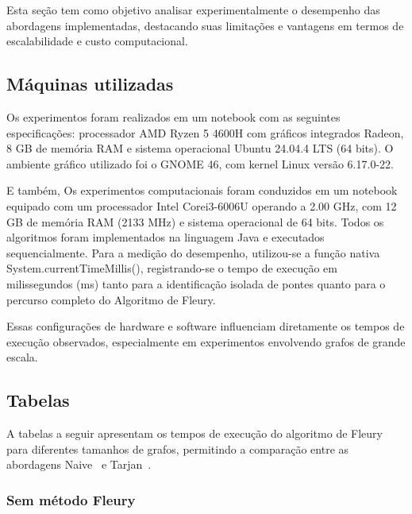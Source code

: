 \documentclass{sbc2023}%
\begin{document}
Esta seção tem como objetivo analisar experimentalmente o desempenho das abordagens implementadas, destacando suas limitações e vantagens em termos de escalabilidade e custo computacional.

\subsection{Máquinas utilizadas}
Os experimentos foram realizados em um notebook com as seguintes especificações: processador AMD Ryzen 5 4600H com gráficos integrados Radeon, 8 GB de memória RAM e sistema operacional Ubuntu 24.04.4 LTS (64 bits). O ambiente gráfico utilizado foi o GNOME 46, com kernel Linux versão 6.17.0-22.

E também, Os experimentos computacionais foram conduzidos em um notebook equipado com um processador Intel Corei3-6006U operando a 2.00 GHz, com 12 GB de memória RAM (2133 MHz) e sistema operacional de 64 bits. Todos os algoritmos foram implementados na linguagem Java e executados sequencialmente. Para a medição do desempenho, utilizou-se a função nativa System.currentTimeMillis(), registrando-se o tempo de execução em milissegundos (ms) tanto para a identificação isolada de pontes quanto para o percurso completo do Algoritmo de Fleury.

Essas configurações de hardware e software influenciam diretamente os tempos de execução observados, especialmente em experimentos envolvendo grafos de grande escala.

\subsection{Tabelas}

A tabelas a seguir apresentam os tempos de execução do algoritmo de Fleury~\cite{AlgoFleury} para diferentes tamanhos de grafos, permitindo a comparação entre as abordagens Naive~\cite{cormen2022Naive} e Tarjan~\cite{tarjan1972dfs}.

\subsubsection{Sem método Fleury}
\end{document}
